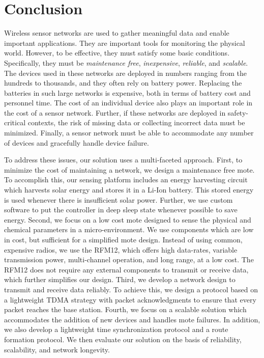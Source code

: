 \chapter{Conclusion}

Wireless sensor networks are used to gather meaningful data and enable important applications. They are important tools for monitoring the physical world. However, to be effective, they must satisfy some basic conditions. Specifically, they must be \textit{maintenance free}, \textit{inexpensive}, \textit{reliable}, and \textit{scalable}. The devices used in these networks are deployed in numbers ranging from the hundreds to thousands, and they often rely on battery power. Replacing the batteries in such large networks is expensive, both in terms of battery cost and personnel time. The cost of an individual device also plays an important role in the cost of a sensor network. Further, if these networks are deployed in safety-critical contexts, the risk of missing data or collecting incorrect data must be minimized. Finally, a sensor network must be able to accommodate any number of devices and gracefully handle device failure.

To address these issues, our solution uses a multi-faceted approach. First, to minimize the cost of maintaining a network, we design a maintenance free mote. To accomplish this, our sensing platform includes an energy harvesting circuit which harvests solar energy and stores it in a Li-Ion battery. This stored energy is used whenever there is insufficient solar power. Further, we use custom software to put the controller in deep sleep state whenever possible to save energy. Second, we focus on a low cost mote designed to sense the physical and chemical parameters in a micro-environment. We use components which are low in cost, but sufficient for a simplified mote design. Instead of using common, expensive radios, we use the RFM12, which offers high data-rates, variable transmission power, multi-channel operation, and long range, at a low cost. The RFM12 does not require any external components to transmit or receive data, which further simplifies our design. Third, we develop a network design to transmit and receive data reliably. To achieve this, we design a protocol based on a lightweight TDMA strategy with packet acknowledgments to ensure that every packet reaches the base station. Fourth, we focus on a scalable solution which accommodates the addition of new devices and handles mote failures. In addition, we also develop a lightweight time synchronization protocol and a route formation protocol. We then evaluate our solution on the basis of reliability, scalability, and network longevity.

